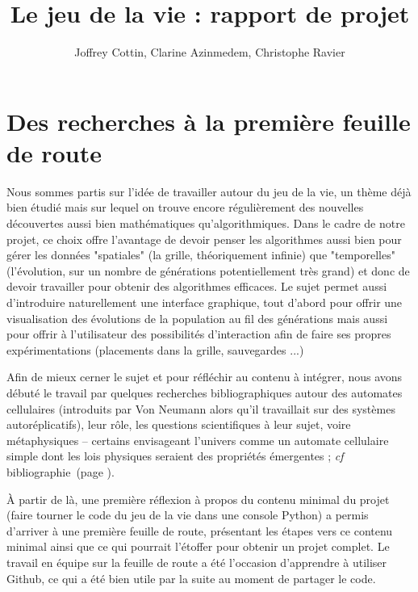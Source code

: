 \documentclass[11pt]{article}
\title{\bf Le jeu de la vie : rapport de projet}
\author{Joffrey Cottin, Clarine Azinmedem, Christophe Ravier}
\begin{document}
\vfill

{\Huge \maketitle}

\vfill

\newpage

\tableofcontents

\newpage

\section{Des recherches à la première feuille de route}

Nous sommes partis sur l'idée de travailler autour du jeu de la vie, un thème déjà bien étudié mais sur lequel on trouve encore régulièrement des nouvelles découvertes aussi bien mathématiques qu'algorithmiques. Dans le cadre de notre projet, ce choix offre l'avantage de devoir penser les algorithmes aussi bien pour gérer les données "spatiales" (la grille, théoriquement infinie) que "temporelles" (l'évolution, sur un nombre de générations potentiellement très grand) et donc de devoir travailler pour obtenir des algorithmes efficaces. Le sujet permet aussi d'introduire naturellement une interface graphique, tout d'abord pour offrir une visualisation des évolutions de la population au fil des générations mais aussi pour offrir à l'utilisateur des possibilités d'interaction afin de faire ses propres expérimentations (placements dans la grille, sauvegardes ...)

Afin de mieux cerner le sujet et pour réfléchir au contenu à intégrer, nous avons débuté le travail par quelques recherches bibliographiques  autour des automates cellulaires (introduits par Von Neumann alors qu'il travaillait sur des systèmes autoréplicatifs), leur rôle, les questions scientifiques à leur sujet, voire métaphysiques -- certains envisageant l'univers comme un automate cellulaire simple dont les lois physiques seraient des propriétés émergentes ; {\it cf} bibliographie~(page \pageref{biblio}).

À partir de là, une première réflexion à propos du contenu minimal du projet (faire tourner le code du jeu de la vie dans une console Python) a permis d'arriver à une première feuille de route, présentant les étapes vers ce contenu minimal ainsi que ce qui pourrait l'étoffer pour obtenir un projet complet. Le travail en équipe sur la feuille de route a été l'occasion d'apprendre à utiliser Github, ce qui a été bien utile par la suite au moment de partager le code.
\end{document}
